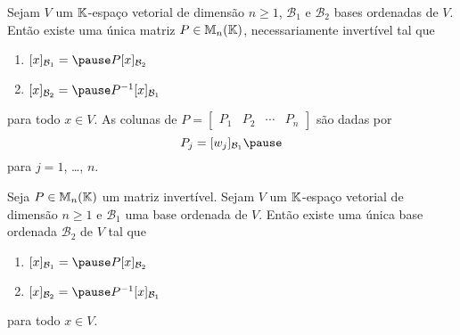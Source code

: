 \documentclass{beamer}
\begin{document}
    \begin{frame}
        \begin{teorema}
            Sejam $V$ um $\mathbb{K}$-espaço vetorial de dimensão $n \ge 1$, \pause $\mathcal{B}_1$ e $\mathcal{B}_2$ bases ordenadas de $V$.
            \pause Então existe uma única matriz $P \in \mathbb{M}_n(\mathbb{K})$, \pause necessariamente invertível tal que\pause
            \begin{enumerate}[label={\roman*})]
                \vspace*{.25cm}
                \item $[x]_{\mathcal{B}_1} = \pause P[x]_{\mathcal{B}_2}$\pause

                \vspace{.75cm}

                \item $[x]_{\mathcal{B}_2} = \pause P^{-1}[x]_{\mathcal{B}_1}$\pause
            \end{enumerate}

            \vspace{.2cm}

            para todo $x \in V$. \pause As colunas de $P = \begin{bmatrix}P_1 & P_2 & \cdots & P_n \end{bmatrix}$ \pause são dadas por\pause
            \[
                P_j = [w_j]_{\mathcal{B}_1}\pause
            \]
            para $j = 1$, \dots, $n$.
        \end{teorema}
    \end{frame}

    \begin{frame}
        \begin{teorema}
            Seja $P \in \mathbb{M}_n(\mathbb{K})$ um matriz invertível. \pause Sejam $V$ um $\mathbb{K}$-espaço vetorial de dimensão $n \ge 1$ \pause e
            $\mathcal{B}_1$ uma base ordenada de $V$. \pause Então existe uma única base ordenada $\mathcal{B}_2$ \pause de $V$ tal que\pause
            \begin{enumerate}[label={\roman*})]
                \vspace*{.25cm}
                \item $[x]_{\mathcal{B}_1} = \pause P[x]_{\mathcal{B}_2}$\pause

                \vspace{.75cm}

                \item $[x]_{\mathcal{B}_2} = \pause P^{-1}[x]_{\mathcal{B}_1}$\pause
            \end{enumerate}

            \vspace{.2cm}

            para todo $x \in V$.
        \end{teorema}
    \end{frame}
\end{document}
